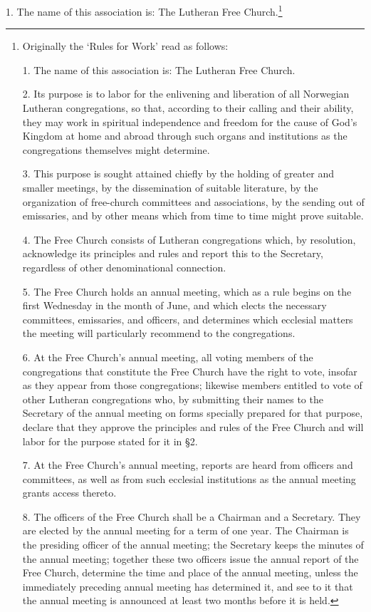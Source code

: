 1. The name of this association is: The Lutheran Free Church.\footnote{Originally the ‘Rules for Work’ read as follows:

1. The name of this association is: The Lutheran Free Church.

2. Its purpose is to labor for the enlivening and liberation of all Norwegian Lutheran congregations, so that, according to their calling and their ability, they may work in spiritual independence and freedom for the cause of God’s Kingdom at home and abroad through such organs and institutions as the congregations themselves might determine.

3. This purpose is sought attained chiefly by the holding of greater and smaller meetings, by the dissemination of suitable literature, by the organization of free-church committees and associations, by the sending out of emissaries, and by other means which from time to time might prove suitable.

4. The Free Church consists of Lutheran congregations which, by resolution, acknowledge its principles and rules and report this to the Secretary, regardless of other denominational connection.

5. The Free Church holds an annual meeting, which as a rule begins on the first Wednesday in the month of June, and which elects the necessary committees, emissaries, and officers, and determines which ecclesial matters the meeting will particularly recommend to the congregations.

6. At the Free Church’s annual meeting, all voting members of the congregations that constitute the Free Church have the right to vote, insofar as they appear from those congregations; likewise members entitled to vote of other Lutheran congregations who, by submitting their names to the Secretary of the annual meeting on forms specially prepared for that purpose, declare that they approve the principles and rules of the Free Church and will labor for the purpose stated for it in §2.

7. At the Free Church’s annual meeting, reports are heard from officers and committees, as well as from such ecclesial institutions as the annual meeting grants access thereto.

8. The officers of the Free Church shall be a Chairman and a Secretary. They are elected by the annual meeting for a term of one year. The Chairman is the presiding officer of the annual meeting; the Secretary keeps the minutes of the annual meeting; together these two officers issue the annual report of the Free Church, determine the time and place of the annual meeting, unless the immediately preceding annual meeting has determined it, and see to it that the annual meeting is announced at least two months before it is held.

}
